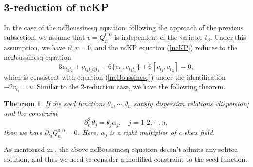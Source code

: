 \documentclass[11p,reqno]{amsart}
\numberwithin{equation}{section}
\newtheorem{theorem}{Theorem}[section]
\numberwithin{equation}{section}
\begin{document}
\subsection{3-reduction of ncKP}
In the case of the ncBoussinesq equation, following the approach of the previous subsection, we assume that $v = Q_n^{0, 0}$ is independent of the variable $t_3$. Under this assumption, we have $\partial_{t_3} v=0$, and the ncKP equation (\ref{ncKP}) reduces to the ncBoussinesq equation
\begin{equation}
    3v_{t_2t_2} + v_{t_1t_1t_1t_1} - 6\{v_{t_1}, v_{t_1t_1}\} + 6[v_{t_1}, v_{t_2}] = 0,
\end{equation}
which is consistent with equation (\ref{ncBoussinesq}) under the identification $-2v_{t_1} = u$. 
Similar to the 2-reduction case, we have the following theorem. 
\begin{theorem}
    If the seed functions $\theta_1,\cdots,\theta_n$ satisfy dispersion relations \eqref{dispersion} and the constraint 
    \begin{equation} \label{seed-Boussinesq}
    \partial_{t_1}^3 \theta_j=\theta_j\alpha_j,\quad j=1,2,\cdots,n,
    \end{equation}
   then we have $\partial_{t_3} Q_n^{0,0}=0$.
Here, $\alpha_j$ is a right multiplier of a skew field.
\end{theorem}
As mentioned in \cite[Section 4]{kodama24}, the above ncBoussinesq equation doesn't admits any soliton solution, and thus we need to consider a modified constraint to the seed function. 
\end{document}
